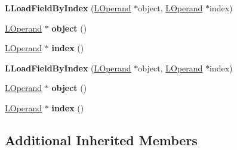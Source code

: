 \begin{DoxyCompactItemize}
\item 
{\bfseries L\+Load\+Field\+By\+Index} (\hyperlink{classv8_1_1internal_1_1_l_operand}{L\+Operand} $\ast$object, \hyperlink{classv8_1_1internal_1_1_l_operand}{L\+Operand} $\ast$index)\hypertarget{classv8_1_1internal_1_1_l_load_field_by_index_ab34ee5ac7fc755b38574c2e4ddf48cbb}{}\label{classv8_1_1internal_1_1_l_load_field_by_index_ab34ee5ac7fc755b38574c2e4ddf48cbb}

\item 
\hyperlink{classv8_1_1internal_1_1_l_operand}{L\+Operand} $\ast$ {\bfseries object} ()\hypertarget{classv8_1_1internal_1_1_l_load_field_by_index_a60238cb7f0566a0951b1f1f0ec12d174}{}\label{classv8_1_1internal_1_1_l_load_field_by_index_a60238cb7f0566a0951b1f1f0ec12d174}

\item 
\hyperlink{classv8_1_1internal_1_1_l_operand}{L\+Operand} $\ast$ {\bfseries index} ()\hypertarget{classv8_1_1internal_1_1_l_load_field_by_index_af40916d3187d009ee7f5df5189d321ca}{}\label{classv8_1_1internal_1_1_l_load_field_by_index_af40916d3187d009ee7f5df5189d321ca}

\item 
{\bfseries L\+Load\+Field\+By\+Index} (\hyperlink{classv8_1_1internal_1_1_l_operand}{L\+Operand} $\ast$object, \hyperlink{classv8_1_1internal_1_1_l_operand}{L\+Operand} $\ast$index)\hypertarget{classv8_1_1internal_1_1_l_load_field_by_index_ab34ee5ac7fc755b38574c2e4ddf48cbb}{}\label{classv8_1_1internal_1_1_l_load_field_by_index_ab34ee5ac7fc755b38574c2e4ddf48cbb}

\item 
\hyperlink{classv8_1_1internal_1_1_l_operand}{L\+Operand} $\ast$ {\bfseries object} ()\hypertarget{classv8_1_1internal_1_1_l_load_field_by_index_a60238cb7f0566a0951b1f1f0ec12d174}{}\label{classv8_1_1internal_1_1_l_load_field_by_index_a60238cb7f0566a0951b1f1f0ec12d174}

\item 
\hyperlink{classv8_1_1internal_1_1_l_operand}{L\+Operand} $\ast$ {\bfseries index} ()\hypertarget{classv8_1_1internal_1_1_l_load_field_by_index_af40916d3187d009ee7f5df5189d321ca}{}\label{classv8_1_1internal_1_1_l_load_field_by_index_af40916d3187d009ee7f5df5189d321ca}

\end{DoxyCompactItemize}
\subsection*{Additional Inherited Members}


